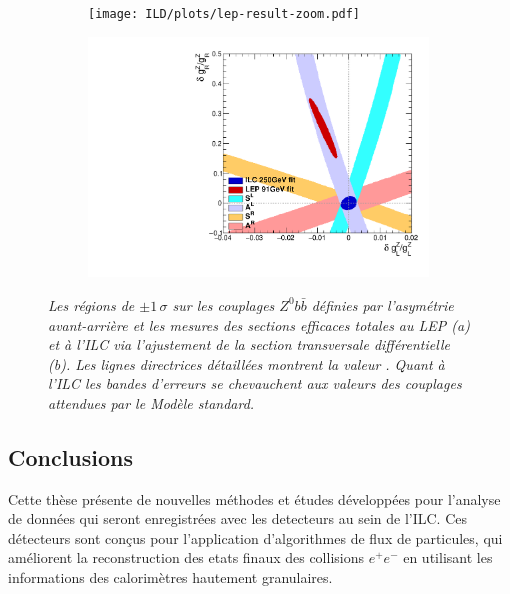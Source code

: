 \begin{figure}
	\centering
	\begin{subfigure}{0.5\textwidth}
		\texttt{[image: ILD/plots/lep-result-zoom.pdf]}
		\caption{\label{fig:LEPILCResult_a_3F} }
	\end{subfigure}%
	\begin{subfigure}{0.5\textwidth}
		\centering
		\includegraphics[width=0.99\textwidth]{ILD/plots/ilc-result.pdf}
		\caption{\label{fig:LEPILCResult_b_3F} }
	\end{subfigure}
	\caption{\sl Les régions de $\pm 1\,\sigma$ sur les couplages $Z^0b\bar{b}$ définies par l'asymétrie avant-arrière et les mesures des sections efficaces totales au LEP (a) et à l'ILC via l'ajustement de la section transversale différentielle (b). Les lignes directrices détaillées montrent la valeur \sm. Quant à l'ILC les bandes d'erreurs se chevauchent aux valeurs des couplages attendues par le Modèle standard.  }
	\label{fig:LEPILCResult_3F}
\end{figure}

\subsection*{Conclusions}

Cette thèse présente de nouvelles méthodes et études développées pour l'analyse de données qui seront enregistrées avec les detecteurs au sein de l'ILC. 
Ces détecteurs sont conçus pour l'application d'algorithmes de flux de particules, qui améliorent la reconstruction des etats finaux des collisions $e^+e^-$ en utilisant les informations des calorimètres hautement granulaires.

